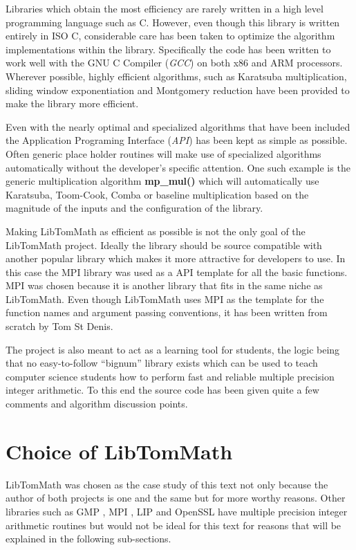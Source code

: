 \documentclass[b5paper]{book}
\begin{document}
Libraries which obtain the most efficiency are rarely written in a high level programming language such as C.  However, 
even though this library is written entirely in ISO C, considerable care has been taken to optimize the algorithm implementations within the 
library.  Specifically the code has been written to work well with the GNU C Compiler (\textit{GCC}) on both x86 and ARM 
processors.  Wherever possible, highly efficient algorithms, such as Karatsuba multiplication, sliding window 
exponentiation and Montgomery reduction have been provided to make the library more efficient.  

Even with the nearly optimal and specialized algorithms that have been included the Application Programing Interface 
(\textit{API}) has been kept as simple as possible.  Often generic place holder routines will make use of specialized 
algorithms automatically without the developer's specific attention.  One such example is the generic multiplication 
algorithm \textbf{mp\_mul()} which will automatically use Karatsuba, Toom-Cook, Comba or baseline multiplication 
based on the magnitude of the inputs and the configuration of the library.  

Making LibTomMath as efficient as possible is not the only goal of the LibTomMath project.  Ideally the library should 
be source compatible with another popular library which makes it more attractive for developers to use.  In this case the
MPI library was used as a API template for all the basic functions.  MPI was chosen because it is another library that fits 
in the same niche as LibTomMath.  Even though LibTomMath uses MPI as the template for the function names and argument 
passing conventions, it has been written from scratch by Tom St Denis.

The project is also meant to act as a learning tool for students, the logic being that no easy-to-follow ``bignum'' 
library exists which can be used to teach computer science students how to perform fast and reliable multiple precision 
integer arithmetic.  To this end the source code has been given quite a few comments and algorithm discussion points.  

\section{Choice of LibTomMath}
LibTomMath was chosen as the case study of this text not only because the author of both projects is one and the same but
for more worthy reasons.  Other libraries such as GMP \cite{GMP}, MPI \cite{MPI}, LIP \cite{LIP} and OpenSSL 
\cite{OPENSSL} have multiple precision integer arithmetic routines but would not be ideal for this text for 
reasons that will be explained in the following sub-sections.
\end{document}
